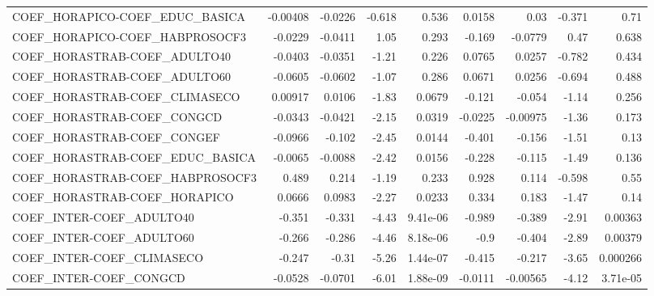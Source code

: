 \begin{tabular}{lrrrrrrrr}
COEF\_HORAPICO-COEF\_EDUC\_BASICA         &    -0.00408 &      -0.0226 &   -0.618 &    0.536 &     0.0158 &        0.03 &       -0.371 &          0.71 \\
COEF\_HORAPICO-COEF\_HABPROSOCF3         &     -0.0229 &      -0.0411 &     1.05 &    0.293 &     -0.169 &     -0.0779 &         0.47 &         0.638 \\
COEF\_HORASTRAB-COEF\_ADULTO40           &     -0.0403 &      -0.0351 &    -1.21 &    0.226 &     0.0765 &      0.0257 &       -0.782 &         0.434 \\
COEF\_HORASTRAB-COEF\_ADULTO60           &     -0.0605 &      -0.0602 &    -1.07 &    0.286 &     0.0671 &      0.0256 &       -0.694 &         0.488 \\
COEF\_HORASTRAB-COEF\_CLIMASECO          &     0.00917 &       0.0106 &    -1.83 &   0.0679 &     -0.121 &      -0.054 &        -1.14 &         0.256 \\
COEF\_HORASTRAB-COEF\_CONGCD             &     -0.0343 &      -0.0421 &    -2.15 &   0.0319 &    -0.0225 &    -0.00975 &        -1.36 &         0.173 \\
COEF\_HORASTRAB-COEF\_CONGEF             &     -0.0966 &       -0.102 &    -2.45 &   0.0144 &     -0.401 &      -0.156 &        -1.51 &          0.13 \\
COEF\_HORASTRAB-COEF\_EDUC\_BASICA        &     -0.0065 &      -0.0088 &    -2.42 &   0.0156 &     -0.228 &      -0.115 &        -1.49 &         0.136 \\
COEF\_HORASTRAB-COEF\_HABPROSOCF3        &       0.489 &        0.214 &    -1.19 &    0.233 &      0.928 &       0.114 &       -0.598 &          0.55 \\
COEF\_HORASTRAB-COEF\_HORAPICO           &      0.0666 &       0.0983 &    -2.27 &   0.0233 &      0.334 &       0.183 &        -1.47 &          0.14 \\
COEF\_INTER-COEF\_ADULTO40               &      -0.351 &       -0.331 &    -4.43 & 9.41e-06 &     -0.989 &      -0.389 &        -2.91 &       0.00363 \\
COEF\_INTER-COEF\_ADULTO60               &      -0.266 &       -0.286 &    -4.46 & 8.18e-06 &       -0.9 &      -0.404 &        -2.89 &       0.00379 \\
COEF\_INTER-COEF\_CLIMASECO              &      -0.247 &        -0.31 &    -5.26 & 1.44e-07 &     -0.415 &      -0.217 &        -3.65 &      0.000266 \\
COEF\_INTER-COEF\_CONGCD                 &     -0.0528 &      -0.0701 &    -6.01 & 1.88e-09 &    -0.0111 &    -0.00565 &        -4.12 &      3.71e-05 \\

\end{tabular}
